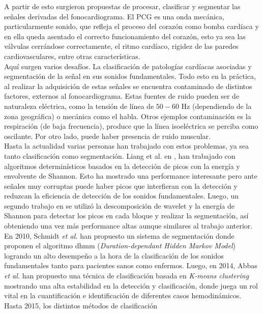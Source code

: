 A partir de esto surgieron propuestas de procesar, clasificar y segmentar las señales derivadas del
fonocardiograma. El PCG es una onda mecánica, particularmente sonido, que refleja el proceso del corazón como
bomba cardíaca y en ella queda asentado el correcto funcionamiento del corazón, esto ya sea las válvulas
cerrándose correctamente, el ritmo cardíaco, rigidez de las paredes cardiovasculares, entre otras
características. \\
\indent Aquí surgen varios desafíos. La clasificación de patologías cardíacas asociadas y segmentación de la
señal en sus sonidos fundamentales. Todo esto en la práctica, al realizar la adquisición de estas señales se
encuentra contaminado de distintos factores, externos al fonocardiograma. Estas fuentes de ruido pueden ser de
naturaleza eléctrica, como la tensión de línea de $50-60$ Hz (dependiendo de la zona geográfica) o mecánica como el
habla. Otros ejemplos contaminación es la respiración (de baja frecuencia), produce que la línea isoeléctrica se
perciba como oscilante. Por otro lado, puede haber presencia de ruido muscular. \\
\indent Hasta la actualidad varias personas han trabajado con estos problemas, ya sea tanto clasificación como
segmentación. Liang et al. en \cite{pp:liang}, han trabajado con algoritmos determinísticos basados en la detección
de picos con la energía y envolvente de Shannon. Esto ha mostrado una performance interesante pero ante señales muy
corruptas puede haber picos que interfieran con la detección y reduzcan la eficiencia de detección de los sonidos
fundamentales. Luego, un segundo trabajo en \cite{pp:liang2} se utilizó la descomposición de wavelet y la energía de
Shannon para detectar los picos en cada bloque y realizar la segmentación, así obteniendo una vez más performance
altas aunque similares al trabajo anterior. \\
\indent En 2010, Schmidt \textit{et al.} \cite{pp:schmidt2010} han propuesto un sistema de segmentación donde
proponen el algoritmo \acrshort{dhmm} (\textit{Duration-dependant Hidden Markov Model}) logrando un alto desempeño a
la hora de la clasificación de los sonidos fundamentales tanto para pacientes sanos como enfermos. Luego, en 2014,
Abbas \textit{et al.} \cite{pp:abbas2014} han propuesto una técnica de clasificación basada en \textit{K-means
clustering} mostrando una alta estabilidad en la detección y clasificación, donde juega un rol vital en la
cuantificación e identificación de diferentes casos hemodinámicos. Hasta 2015, los distintos métodos de clasificación
